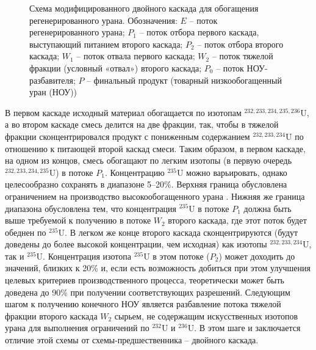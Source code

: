 \begin{figure}[ht]
    \caption{Схема модифицированного двойного каскада для обогащения регенерированного урана. Обозначения: $E$ -- поток регенерированного урана; $P_1$ -- поток отбора первого каскада, выступающий питанием второго каскада; $P_2$ -- поток отбора второго каскада; $W_1$ -- поток отвала первого каскада; $W_2$ -- поток тяжелой фракции (условный «отвал») второго каскада; $P_0$ -- поток НОУ-разбавителя; $P$ -- финальный продукт (товарный низкообогащенный уран (НОУ))}\label{p2left}
\end{figure}

В первом каскаде исходный материал обогащается по изотопам $^{232,233,234,235,236}$U, а во втором каскаде смесь делится на две фракции, так, чтобы в тяжелой фракции сконцентрировался продукт с пониженным содержанием $^{232,233,234}$U по отношению к питающей второй каскад смеси. Таким образом, в первом каскаде, на одном из концов, смесь обогащают по легким изотопы (в первую очередь $^{232,233,234,235}$U) в потоке $P_1$. Концентрацию $^{235}$U можно варьировать, однако целесообразно сохранять в диапазоне 5–20\%. Верхняя граница обусловлена ограничением на производство высокообогащенного урана \cite{brownOriginsSignificanceLimit2016}. Нижняя же граница диапазона обусловлена тем, что концентрация $^{235}$U в потоке $P_1$ должна быть выше требуемой к получению в потоке $W_2$ второго каскада, где этот поток будет обеднен по $^{235}$U. В легком же конце второго каскада сконцентрируются (будут доведены до более высокой концентрации, чем исходная) как изотопы $^{232,233,234}$U, так и $^{235}$U. Концентрация изотопа $^{235}$U в этом потоке ($P_2$) может доходить до значений, близких к 20\% и, если есть возможность добиться при этом улучшения целевых критериев производственного процесса, теоретически может быть доведена до 90\% при получении соответствующих разрешений. Следующим шагом к получению конечного НОУ является разбавление потока тяжелой фракции второго каскада $W_2$ сырьем, не содержащим искусственных изотопов урана для выполнения ограничений по $^{232}$U и $^{236}$U. В этом шаге и заключается отличие этой схемы от схемы-предшественника -- двойного каскада.

